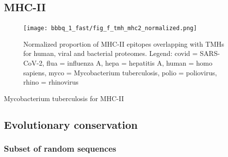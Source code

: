 \subsection{MHC-II}

\begin{figure}[!htbp]
  \texttt{[image: bbbq\_1\_fast/fig\_f\_tmh\_mhc2\_normalized.png]}
  \caption{
    Normalized proportion of MHC-II epitopes overlapping with TMHs
    for human, viral and bacterial proteomes.
    Legend: covid = SARS-CoV-2, flua = influenza A, hepa = hepatitis A,
    human = homo sapiens, myco = Mycobacterium tuberculosis, 
    polio = poliovirus, rhino = rhinovirus
  }
  \label{fig:f_tmh_mhc2_normalized}
\end{figure}

  

%   

%   
      Mycobacterium tuberculosis for MHC-II

\subsection{Evolutionary conservation}

\subsubsection{Subset of random sequences}


